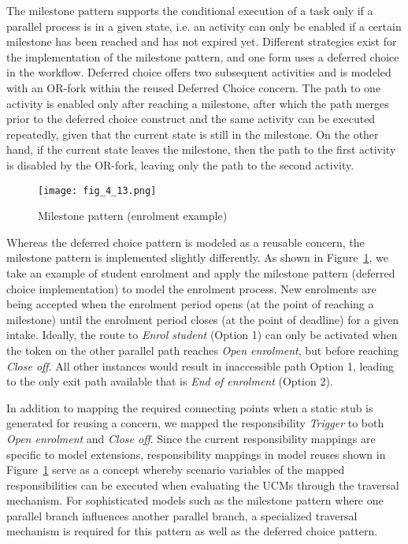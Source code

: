 The milestone pattern supports the conditional execution of a task only if a parallel process is in a given state, i.e. an activity can only be enabled if a certain milestone has been reached and has not expired yet. Different strategies exist for the implementation of the milestone pattern, and one form uses a deferred choice in the workflow. Deferred choice offers two subsequent activities and is modeled with an OR-fork within the reused Deferred Choice concern. The path to one activity is enabled only after reaching a milestone, after which the path merges prior to the deferred choice construct and the same activity can be executed repeatedly, given that the current state is still in the milestone. On the other hand, if the current state leaves the milestone, then the path to the first activity is disabled by the OR-fork, leaving only the path to the second activity.

\begin{figure}
	\centering
	\texttt{[image: fig\_4\_13.png]}
	\caption{Milestone pattern (enrolment example)}
	\label{fig:4.13}
\end{figure}

Whereas the deferred choice pattern is modeled as a reusable concern, the milestone pattern is implemented slightly differently. As shown in Figure~\ref{fig:4.13}, we take an example of student enrolment and apply the milestone pattern (deferred choice implementation) to model the enrolment process. New enrolments are being accepted when the enrolment period opens (at the point of reaching a milestone) until the enrolment period closes (at the point of deadline) for a given intake. Ideally, the route to \emph{Enrol student} (Option 1) can only be activated when the token on the other parallel path reaches \emph{Open enrolment}, but before reaching \emph{Close off}. All other instances would result in inaccessible path Option 1, leading to the only exit path available that is \emph{End of enrolment} (Option 2).

In addition to mapping the required connecting points when a static stub is generated for reusing a concern, we mapped the responsibility \emph{Trigger} to both \emph{Open enrolment} and \emph{Close off}. Since the current responsibility mappings are specific to model extensions, responsibility mappings in model reuses shown in Figure~\ref{fig:4.13} serve as a concept whereby scenario variables of the mapped responsibilities can be executed when evaluating the UCMs through the traversal mechanism. For sophisticated models such as the milestone pattern where one parallel branch influences another parallel branch, a specialized traversal mechanism is required for this pattern as well as the deferred choice pattern.

